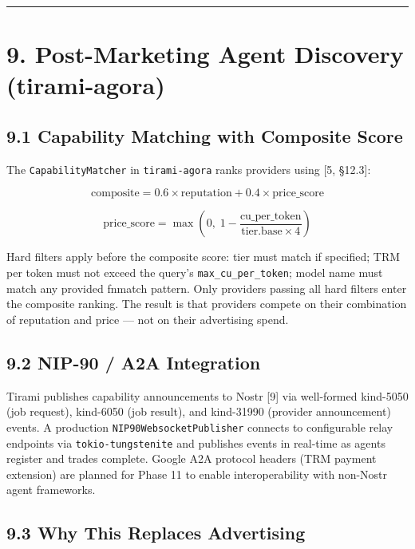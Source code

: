 \documentclass[
  11pt,
]{article}
\begin{document}
\begin{center}\rule{0.5\linewidth}{0.5pt}\end{center}

\section{9. Post-Marketing Agent Discovery
(tirami-agora)}\label{post-marketing-agent-discovery-tirami-agora}

\subsection{9.1 Capability Matching with Composite
Score}\label{capability-matching-with-composite-score}

The \texttt{CapabilityMatcher} in \texttt{tirami-agora} ranks providers
using {[}5, §12.3{]}:

\[\text{composite} = 0.6 \times \text{reputation} + 0.4 \times \text{price\_score}\]

\[\text{price\_score} = \max\!\left(0,\; 1 - \frac{\text{cu\_per\_token}}{\text{tier.base} \times 4}\right)\]

Hard filters apply before the composite score: tier must match if
specified; TRM per token must not exceed the query's
\texttt{max\_cu\_per\_token}; model name must match any provided fnmatch
pattern. Only providers passing all hard filters enter the composite
ranking. The result is that providers compete on their combination of
reputation and price --- not on their advertising spend.

\subsection{9.2 NIP-90 / A2A Integration}\label{nip-90-a2a-integration}

Tirami publishes capability announcements to Nostr {[}9{]} via
well-formed kind-5050 (job request), kind-6050 (job result), and
kind-31990 (provider announcement) events. A production
\texttt{NIP90WebsocketPublisher} connects to configurable relay
endpoints via \texttt{tokio-tungstenite} and publishes events in
real-time as agents register and trades complete. Google A2A protocol
headers (TRM payment extension) are planned for Phase 11 to enable
interoperability with non-Nostr agent frameworks.

\subsection{9.3 Why This Replaces
Advertising}\label{why-this-replaces-advertising}
\end{document}
